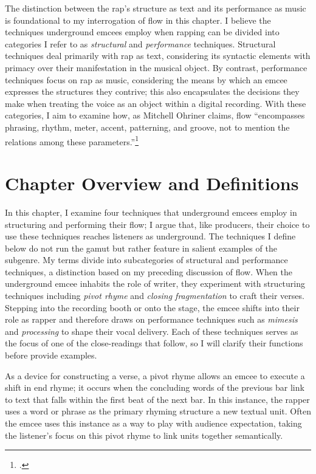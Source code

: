 The distinction between the rap's structure as text and its performance as music is foundational
to my interrogation of flow in this chapter. I believe the techniques underground emcees employ 
when rapping can be divided into  categories I refer to as \emph{structural} and \emph{performance}
techniques. Structural techniques deal primarily with rap as text, considering its syntactic 
elements with primacy over their manifestation in the musical object. By contrast, performance
techniques focus on rap as music, considering the means by which an emcee expresses the structures
they contrive; this also encapsulates the decisions they make when treating the voice as an object
within a digital recording. With these categories, I aim to examine how, as Mitchell Ohriner claims,
flow ``encompasses phrasing, rhythm, meter, accent, patterning, and groove, not to mention the 
relations among these parameters.''\footnote{
    \autocite[28]{mitchellohrinerFlowRhythmicVoice2019}.}

\section{Chapter Overview and Definitions}

In this chapter, I examine four techniques that underground emcees employ in structuring and
performing their flow; I argue that, like producers, their choice to use these techniques reaches
listeners as underground. The techniques I define below do not run the gamut but rather feature in
salient examples of the subgenre. My terms divide into subcategories of structural and performance
techniques, a distinction based on my preceding discussion of flow. When the underground emcee 
inhabits the role of writer, they experiment with structuring techniques including \emph{pivot rhyme}
and \emph{closing fragmentation} to craft their verses. Stepping into the recording booth or onto 
the stage, the emcee shifts into their role as rapper and therefore draws on performance techniques
such as \emph{mimesis} and \emph{processing} to shape their vocal delivery. Each of these techniques
serves as the focus of one of the close-readings that follow, so I will clarify their functions 
before provide examples.

As a device for constructing a verse, a pivot rhyme allows an emcee to execute a shift in end rhyme;
it occurs when the concluding words of the previous bar link to text that falls within the first beat
of the next bar. In this instance, the rapper uses a word or phrase as the primary rhyming structure
a new textual unit. Often the emcee uses this instance as a way to play with audience expectation, 
taking the listener's focus on this pivot rhyme to link units together semantically.

